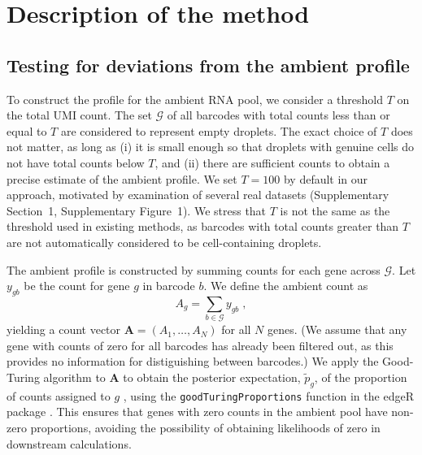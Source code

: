 \documentclass[10pt,letterpaper]{article}
\newcommand{\code}[1]{\texttt{#1}}
\newcommand{\suppfignegative}{1}
\newcommand{\suppsecthreshold}{1}
\begin{document}
\section*{Description of the method}

\subsection*{Testing for deviations from the ambient profile}
To construct the profile for the ambient RNA pool, we consider a threshold $T$ on the total UMI count.
The set $\mathcal{G}$ of all barcodes with total counts less than or equal to $T$ are considered to represent empty droplets.
The exact choice of $T$ does not matter, as long as (i) it is small enough so that droplets with genuine cells do not have total counts below $T$,
and (ii) there are sufficient counts to obtain a precise estimate of the ambient profile.
We set $T=100$ by default in our approach, motivated by examination of several real datasets (Supplementary Section~\suppsecthreshold{}, Supplementary Figure~\suppfignegative{}).
We stress that $T$ is not the same as the threshold used in existing methods, as barcodes with total counts greater than $T$ are not automatically considered to be cell-containing droplets.

The ambient profile is constructed by summing counts for each gene across $\mathcal{G}$.
Let $y_{gb}$ be the count for gene $g$ in barcode $b$.
We define the ambient count as 
\[
    A_{g} = \sum_{b \in \mathcal{G}} y_{gb} \;,
\]
yielding a count vector $\mathbf{A} = (A_1, \dots, A_N)$ for all $N$ genes.
(We assume that any gene with counts of zero for all barcodes has already been filtered out, as this provides no information for distiguishing between barcodes.)
We apply the Good-Turing algorithm to $\mathbf{A}$ to obtain the posterior expectation, $\tilde{p}_g$, of the proportion of counts assigned to $g$ \cite{gale1995good}, using the \code{goodTuringProportions} function in the \textsf{edgeR} package \cite{robinson2010edgeR}.
This ensures that genes with zero counts in the ambient pool have non-zero proportions, avoiding the possibility of obtaining likelihoods of zero in downstream calculations.
\end{document}
